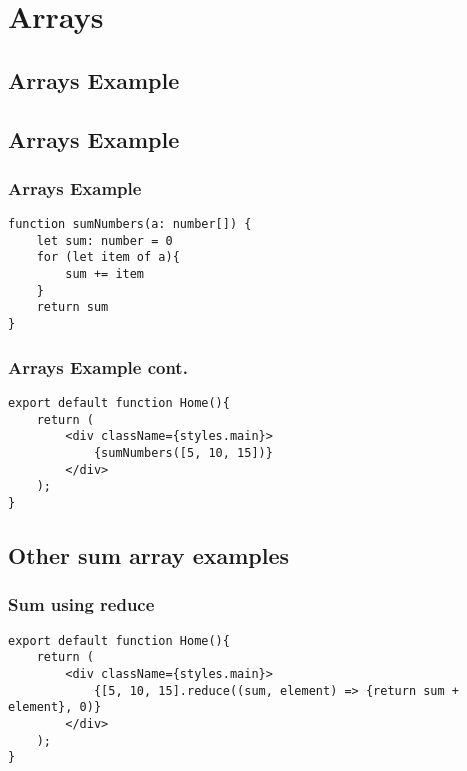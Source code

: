 \documentclass{beamer}
\begin{document}
\section{Arrays}

\subsection{Arrays Example}
\begin{frame}[fragile]
\subsection{Arrays Example}
\frametitle{Arrays Example}
\begin{lstlisting}
function sumNumbers(a: number[]) {
    let sum: number = 0
    for (let item of a){
        sum += item
    }
    return sum
}
\end{lstlisting}
\end{frame}

\begin{frame}[fragile]
\frametitle{Arrays Example cont.}
\begin{lstlisting}
export default function Home(){
    return (
        <div className={styles.main}>
            {sumNumbers([5, 10, 15])}
        </div>
    );
}
\end{lstlisting}
\end{frame}

\subsection{Other sum array examples}

\begin{frame}[fragile]
\frametitle{Sum using reduce}
\begin{lstlisting}
export default function Home(){
    return (
        <div className={styles.main}>
            {[5, 10, 15].reduce((sum, element) => {return sum + element}, 0)}
        </div>
    );
}
\end{lstlisting}
\end{frame}
\end{document}
